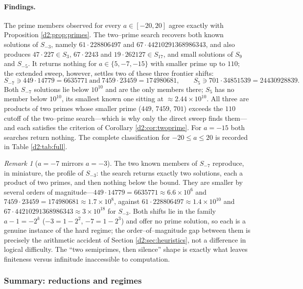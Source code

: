 \documentclass[a4paper]{article}
\theoremstyle{plain}
\theoremstyle{definition}
\theoremstyle{remark}
\newtheorem{remark}{Remark}[subsection]
\begin{document}
\paragraph{Findings.} The prime members observed for every $a\in[-20,20]$ agree exactly with Proposition \ref{d2:prop:primes}. The two--prime search recovers both known solutions of $S_{-3}$, namely $61\cdot228806497$ and $67\cdot44210291368986343$, and also produces $47\cdot227\in S_3$, $67\cdot2243$ and $19\cdot262127\in S_{17}$, and small solutions of $S_9$ and $S_{-5}$. It returns nothing for $a\in\{5,-7,-15\}$ with smaller prime up to $110$; the extended sweep, however, settles two of these three frontier shifts:
\[
S_{-7}\ni 449\cdot14779=6635771\ \text{and}\ 7459\cdot23459=174980681,
\qquad
S_5\ni 701\cdot34851539=24430928839.
\]
Both $S_{-7}$ solutions lie below $10^{10}$ and are the only members there; $S_5$ has no member below $10^{10}$, its smallest known one sitting at $\approx2.44\times10^{10}$. All three are products of two primes whose smaller prime ($449$, $7459$, $701$) exceeds the $110$ cutoff of the two--prime search---which is why only the direct sweep finds them---and each satisfies the criterion of Corollary \ref{d2:cor:twoprime}. For $a=-15$ both searches return nothing. The complete classification for $-20\le a\le20$ is recorded in Table \ref{d2:tab:full}.

\begin{remark}[$a=-7$ mirrors $a=-3$]\label{d2:rem:minus7}
The two known members of $S_{-7}$ reproduce, in miniature, the profile of $S_{-3}$: the search returns exactly two solutions, each a product of two primes, and then nothing below the bound. They are smaller by several orders of magnitude---$449\cdot14779=6635771\approx6.6\times10^{6}$ and $7459\cdot23459=174980681\approx1.7\times10^{8}$, against $61\cdot228806497\approx1.4\times10^{10}$ and $67\cdot44210291368986343\approx3\times10^{18}$ for $S_{-3}$. Both shifts lie in the family $a-1=-2^{k}$ ($-3=1-2^{2}$, $-7=1-2^{3}$) and offer no prime solution, so each is a genuine instance of the hard regime; the order--of--magnitude gap between them is precisely the arithmetic accident of Section \ref{d2:sec:heuristics}, not a difference in logical difficulty. The ``two semiprimes, then silence'' shape is exactly what leaves finiteness versus infinitude inaccessible to computation.
\end{remark}

\subsubsection{Summary: reductions and regimes}\label{d2:sec:summary}
\end{document}
